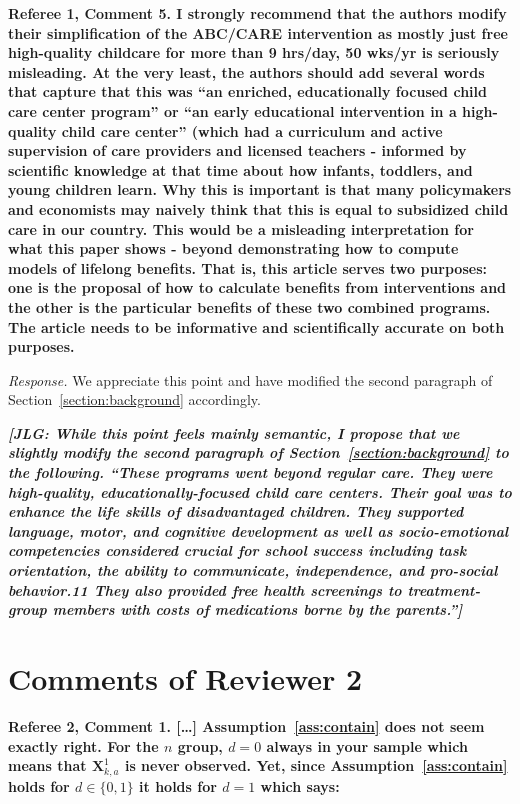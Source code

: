 \noindent \textbf{Referee 1, Comment 5. I strongly recommend that the authors modify their simplification of the ABC/CARE intervention as mostly just free high-quality childcare for more than 9 hrs/day, 50 wks/yr is seriously misleading. At the very least, the authors should add several words that capture that this was ``an enriched, educationally focused child care center program'' or ``an early educational intervention in a high-quality child care center'' (which had a curriculum and active supervision of care providers and licensed teachers - informed by scientific knowledge at that time about how infants, toddlers, and young children learn. Why this is important is that many policymakers and economists may naively think that this is equal to subsidized child care in our country. This would be a misleading interpretation for what this paper shows - beyond demonstrating how to compute models of lifelong benefits. That is, this article serves two purposes: one is the proposal of how to calculate benefits from interventions and the other is the particular benefits of these two combined programs. The article needs to be informative and scientifically accurate on both purposes.}

\noindent \textit{Response.} We appreciate this point and have modified the second paragraph of Section~\ref{section:background} accordingly.

\textit{\textbf{[JLG: While this point feels mainly semantic, I propose that we slightly modify the second paragraph of Section~\ref{section:background} to the following. ``These programs went beyond regular care. They were high-quality, educationally-focused child care centers. Their goal was to enhance the life skills of disadvantaged children. They supported language, motor, and cognitive development as well as socio-emotional competencies considered crucial for school success including task orientation, the ability to communicate, independence, and pro-social behavior.11 They also provided free health screenings to treatment-group members with costs of medications borne by the parents.'']}}

\section*{Comments of Reviewer 2}

\noindent \textbf{Referee 2, Comment 1. [\ldots] Assumption~\ref{ass:contain} does not seem exactly right. For the $n$ group, $d = 0$ always in your sample which means that $\bm{X}_{k,a}^1$ is never observed. Yet, since Assumption~\ref{ass:contain} holds for $d \in \{ 0,1 \}$ it holds for $d = 1$ which says:} 

